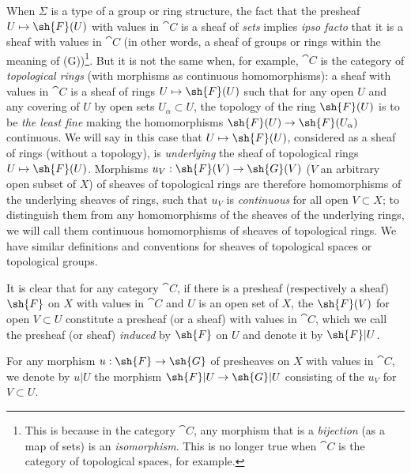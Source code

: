 \begin{env}[3.1.4]
\label{0.3.1.4}
When $\Sigma$ is a type of a group or ring structure, the fact that the presheaf
$U\mapsto\sh{F}(U)$ with values in $\cat{C}$ is a sheaf of \emph{sets} implies
\emph{ipso facto} that it is a sheaf with values in $\cat{C}$ (in other words, a
sheaf of groups or rings within the meaning of (G))\footnote{This is because in
the category $\cat{C}$, any morphism that is a \emph{bijection} (as a map of sets) is
an \emph{isomorphism}. This is no longer true when $\cat{C}$ is the category of
topological spaces, for example.}. But it is not the same when, for example,
$\cat{C}$ is the category of \emph{topological rings} (with morphisms as continuous
homomorphisms): a sheaf with values in $\cat{C}$ is a sheaf of rings
$U\mapsto\sh{F}(U)$ such that for any open $U$ and any covering of $U$ by open
sets $U_\alpha\subset U$, the topology of the ring $\sh{F}(U)$ is to be
\emph{the least fine} making the homomorphisms $\sh{F}(U)\to\sh{F}(U_\alpha)$
continuous. We will say in this case that $U\mapsto\sh{F}(U)$, considered as a
sheaf of rings (without a topology), is \emph{underlying} the sheaf of
topological rings $U\mapsto\sh{F}(U)$. Morphisms $u_V:\sh{F}(V)\to\sh{G}(V)$
($V$ an arbitrary open subset of $X$) of sheaves of topological rings are
therefore homomorphisms of the underlying sheaves of rings, such that $u_V$ is
\emph{continuous} for all open $V\subset X$; to distinguish them from any
homomorphisms of the sheaves of the underlying rings, we will call them
continuous homomorphisms of sheaves of topological rings. We have similar
definitions and conventions for sheaves of topological spaces or topological
groups.
\end{env}

\begin{env}[3.1.5]
\label{0.3.1.5}
It is clear that for any category $\cat{C}$, if there is a presheaf (respectively a
sheaf) $\sh{F}$ on $X$ with values in $\cat{C}$ and $U$ is an open set of $X$, the
$\sh{F}(V)$ for open $V\subset U$ constitute a presheaf (or a sheaf) with values
in $\cat{C}$, which we call the presheaf (or sheaf) \emph{induced} by $\sh{F}$ on $U$
and denote it by $\sh{F}|U$.

For any morphism $u:\sh{F}\to\sh{G}$ of presheaves on $X$ with values in $\cat{C}$,
we denote by $u|U$ the morphism $\sh{F}|U\to\sh{G}|U$ consisting of the $u_V$
for $V\subset U$.
\end{env}

